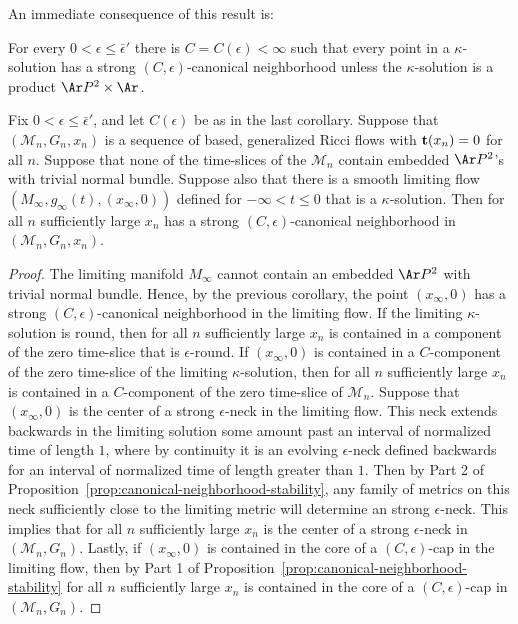 An immediate consequence of this result is:

\begin{corollary}\label{cor:canonical-neighborhood-existence}
\label{kappacannbhd}
For every $0<\epsilon\le\bar\epsilon'$ there is
$C=C(\epsilon)<\infty$ such that every point in a $\kappa$-solution
has a strong $(C,\epsilon)$-canonical neighborhood unless the
$\kappa$-solution is a product $\Ar P^2\times \Ar$.
\end{corollary}


\begin{corollary}\label{cor:canonical-neighborhood-limit-passage}
\label{limitcannbhd}
Fix $0<\epsilon\le \bar\epsilon'$, and let $C(\epsilon)$ be as in
the last corollary. Suppose that $({\mathcal M}_n,G_n,x_n)$ is a
sequence of based, generalized Ricci flows with ${\bf t}(x_n)=0$ for
all $n$. Suppose that none of the time-slices of the ${\mathcal
M}_n$ contain embedded $\Ar P^2$'s with trivial normal bundle.
Suppose also that there is a smooth limiting flow
$(M_\infty,g_\infty(t),(x_\infty,0))$ defined for $-\infty<t\le 0$
that is a $\kappa$-solution. Then for all $n$ sufficiently large
$x_n$ has a strong $(C,\epsilon)$-canonical neighborhood in
$({\mathcal M}_n,G_n,x_n)$.
\end{corollary}


\begin{proof}
The limiting manifold $M_\infty$ cannot contain an embedded $\Ar
P^2$ with trivial normal bundle. Hence, by the previous corollary,
the point $(x_\infty,0)$ has a strong $(C,\epsilon)$-canonical
neighborhood in the limiting flow. If the limiting $\kappa$-solution
is round, then for all $n$ sufficiently large $x_n$ is contained in
a component of the zero time-slice that is $\epsilon$-round. If
$(x_\infty,0)$ is contained in a $C$-component of the zero
time-slice of the limiting $\kappa$-solution, then for all $n$
sufficiently large $x_n$ is contained in a $C$-component of the zero
time-slice of ${\mathcal M}_n$. Suppose that $(x_\infty,0)$ is the
center of a strong $\epsilon$-neck in the limiting flow. This neck
extends backwards in the limiting solution some amount past an
interval of normalized time of length  $1$, where by continuity it
is an evolving $\epsilon$-neck defined backwards for an interval of
normalized time of length  greater than $1$. Then by Part 2 of
Proposition~\ref{prop:canonical-neighborhood-stability}, any family of metrics on this neck
sufficiently close to the limiting metric will determine an strong
$\epsilon$-neck. This implies that for all $n$ sufficiently large
$x_n$ is the center of a strong $\epsilon$-neck in $({\mathcal
M}_n,G_n)$. Lastly, if $(x_\infty,0)$ is contained in the core of a
$(C,\epsilon)$-cap in the limiting flow, then by Part 1 of
Proposition~\ref{prop:canonical-neighborhood-stability} for all $n$ sufficiently large $x_n$ is
contained in the core of a $(C,\epsilon)$-cap in $({\mathcal
M}_n,G_n)$.
\end{proof}
